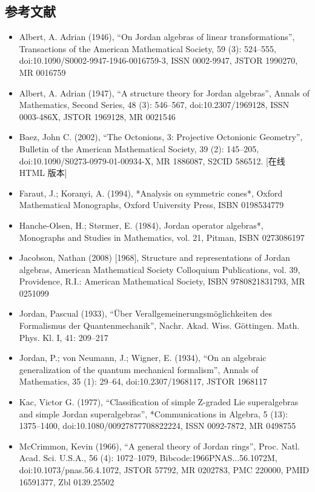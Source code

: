 \subsection{参考文献}
\begin{itemize}
\item Albert, A. Adrian (1946), “On Jordan algebras of linear transformations”, Transactions of the American Mathematical Society, 59 (3): 524–555, doi:10.1090/S0002-9947-1946-0016759-3, ISSN 0002-9947, JSTOR 1990270, MR 0016759
\item Albert, A. Adrian (1947), “A structure theory for Jordan algebras”, Annals of Mathematics, Second Series, 48 (3): 546–567, doi:10.2307/1969128, ISSN 0003-486X, JSTOR 1969128, MR 0021546
\item Baez, John C. (2002), “The Octonions, 3: Projective Octonionic Geometry”, Bulletin of the American Mathematical Society, 39 (2): 145–205, doi:10.1090/S0273-0979-01-00934-X, MR 1886087, S2CID 586512. [在线 HTML 版本]
\item Faraut, J.; Koranyi, A. (1994), *Analysis on symmetric cones*, Oxford Mathematical Monographs, Oxford University Press, ISBN 0198534779
\item Hanche-Olsen, H.; Størmer, E. (1984), Jordan operator algebras*, Monographs and Studies in Mathematics, vol. 21, Pitman, ISBN 0273086197
\item Jacobson, Nathan (2008) [1968], Structure and representations of Jordan algebras, American Mathematical Society Colloquium Publications, vol. 39, Providence, R.I.: American Mathematical Society, ISBN 9780821831793, MR 0251099
\item Jordan, Pascual (1933), “Über Verallgemeinerungsmöglichkeiten des Formalismus der Quantenmechanik”, Nachr. Akad. Wiss. Göttingen. Math. Phys. Kl. I, 41: 209–217
\item Jordan, P.; von Neumann, J.; Wigner, E. (1934), “On an algebraic generalization of the quantum mechanical formalism”, Annals of Mathematics, 35 (1): 29–64, doi:10.2307/1968117, JSTOR 1968117
\item Kac, Victor G. (1977), “Classification of simple Z-graded Lie superalgebras and simple Jordan superalgebras”, *Communications in Algebra, 5 (13): 1375–1400, doi:10.1080/00927877708822224, ISSN 0092-7872, MR 0498755
\item McCrimmon, Kevin (1966), “A general theory of Jordan rings”, Proc. Natl. Acad. Sci. U.S.A., 56 (4): 1072–1079, Bibcode:1966PNAS...56.1072M, doi:10.1073/pnas.56.4.1072, JSTOR 57792, MR 0202783, PMC 220000, PMID 16591377, Zbl 0139.25502

\end{itemize}
